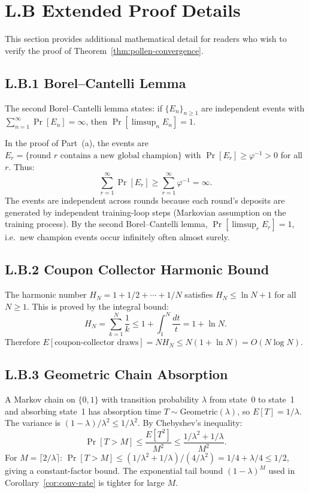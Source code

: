 \section*{L.B \quad Extended Proof Details}
\label{sec:appl-proof-details}

This section provides additional mathematical detail for readers who
wish to verify the proof of Theorem~\ref{thm:pollen-convergence}.

\subsection*{L.B.1 \quad Borel--Cantelli Lemma}

The second Borel--Cantelli lemma states: if $\{E_n\}_{n \geq 1}$ are
independent events with $\sum_{n=1}^{\infty} \Pr[E_n] = \infty$,
then $\Pr[\limsup_n E_n] = 1$.

In the proof of Part~(a), the events are $E_r = \{\text{round } r
\text{ contains a new global champion}\}$ with $\Pr[E_r] \geq
\varphi^{-1} > 0$ for all $r$.  Thus:
\[
  \sum_{r=1}^{\infty} \Pr[E_r] \geq \sum_{r=1}^{\infty} \varphi^{-1} = \infty.
\]
The events are independent across rounds because each round's deposits
are generated by independent training-loop steps (Markovian assumption
on the training process).  By the second Borel--Cantelli lemma,
$\Pr[\limsup_r E_r] = 1$, i.e.\ new champion events occur infinitely
often almost surely.

\subsection*{L.B.2 \quad Coupon Collector Harmonic Bound}

The harmonic number $H_N = 1 + 1/2 + \cdots + 1/N$ satisfies
$H_N \leq \ln N + 1$ for all $N \geq 1$.  This is proved by the
integral bound:
\[
  H_N = \sum_{k=1}^{N} \frac{1}{k} \leq 1 + \int_{1}^{N} \frac{dt}{t} = 1 + \ln N.
\]
Therefore $E[\text{coupon-collector draws}] = N H_N \leq N(1 + \ln N)
= O(N \log N)$.

\subsection*{L.B.3 \quad Geometric Chain Absorption}

A Markov chain on $\{0, 1\}$ with transition probability $\lambda$ from
state~0 to state~1 and absorbing state~1 has absorption time
$T \sim \text{Geometric}(\lambda)$, so $E[T] = 1/\lambda$.  The
variance is $(1-\lambda)/\lambda^{2} \leq 1/\lambda^{2}$.  By
Chebyshev's inequality:
\[
  \Pr[T > M] \leq \frac{E[T^{2}]}{M^{2}} \leq \frac{1/\lambda^{2} + 1/\lambda}{M^{2}}.
\]
For $M = \lceil 2/\lambda \rceil$:
$\Pr[T > M] \leq (1/\lambda^{2} + 1/\lambda) / (4/\lambda^{2})
= 1/4 + \lambda/4 \leq 1/2$,
giving a constant-factor bound.  The exponential tail bound
$(1-\lambda)^{M}$ used in Corollary~\ref{cor:conv-rate} is tighter for
large $M$.

